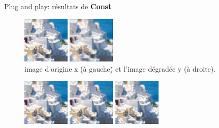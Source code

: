 \documentclass[11pt]{beamer}
\begin{document}
\begin{frame}{Plug and play: résultats de \textbf{Const}}
    \begin{figure}[b]
        \centering
        \includegraphics[width=0.20\textwidth]{../images/hqs_original/0823.png}
        \hspace{1cm}
        \includegraphics[width=0.20\textwidth]{../images/hqs_constant/y.png}
        \caption{image d'origine x (à gauche) et l'image dégradée y (à droite).}
    \end{figure}
    \begin{figure}[b]
        \centering
        \includegraphics[width=0.20\textwidth]{../images/hqs_constant/x_0.png}
        \includegraphics[width=0.20\textwidth]{../images/hqs_constant/z_0.png}
        \includegraphics[width=0.20\textwidth]{../images/hqs_constant/x_1.png}

\end{figure}
\end{frame}
\end{document}

